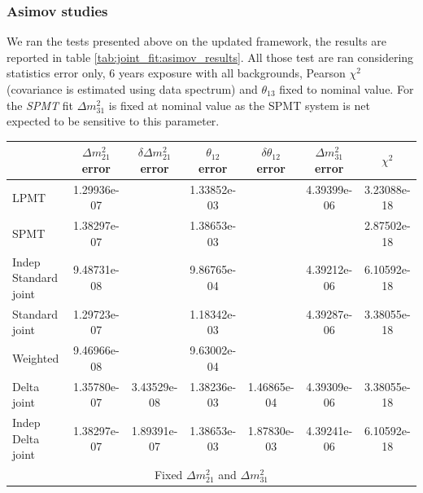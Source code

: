 \documentclass[../main.tex]{subfiles}
\begin{document}
\subsubsection{Asimov studies}

We ran the tests presented above on the updated framework, the results are reported in table \ref{tab:joint_fit:asimov_results}. All those test are ran considering statistics error only, 6 years exposure with all backgrounds, Pearson $\chi^2$ (covariance is estimated using data spectrum) and $\theta_{13}$ fixed to nominal value. For the \textit{SPMT} fit $\Delta m^2_{31}$ is fixed at nominal value as the SPMT system is net expected to be sensitive to this parameter.

\begin{table}[ht]
  \begin{footnotesize}
  \centering
  \begin{tabular}{l | c | c | c | c | c | c }
                                    & $\Delta m^2_{21}$ error  & $\delta \Delta m^2_{21}$ error & $\theta_{12}$ error   & $\delta \theta_{12}$ error  & $\Delta m^2_{31}$ error & $\chi^2$ \\
                                    \hline
  LPMT                                 & 1.29936e-07   &               & 1.33852e-03   &               & 4.39399e-06   & 3.23088e-18 \\
  SPMT                                 & 1.38297e-07   &               & 1.38653e-03   &               &               & 2.87502e-18 \\
  Indep Standard joint                 & 9.48731e-08   &               & 9.86765e-04   &               & 4.39212e-06   & 6.10592e-18 \\
  Standard joint                       & 1.29723e-07   &               & 1.18342e-03   &               & 4.39287e-06   & 3.38055e-18 \\
  Weighted                             & 9.46966e-08   &               & 9.63002e-04   &               &               & \\
  \hline
  Delta joint                            & 1.35780e-07   & 3.43529e-08   & 1.38236e-03   & 1.46865e-04   & 4.39309e-06   & 3.38055e-18 \\
  Indep Delta joint                      & 1.38297e-07   & 1.89391e-07   & 1.38653e-03   & 1.87830e-03   & 4.39241e-06   & 6.10592e-18 \\
  \hline
  \hline
  \multicolumn{7}{c}{Fixed $\Delta m^2_{21}$ and $\Delta m^2_{31}$} \\
  \hline

\end{tabular}
\end{footnotesize}
\end{table}
\end{document}
